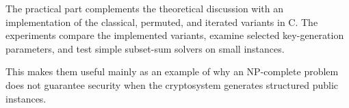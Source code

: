 The practical part complements the theoretical discussion with an implementation
of the classical, permuted, and iterated variants in C. The experiments
compare the implemented variants, examine selected key-generation parameters,
and test simple subset-sum solvers on small instances.

This makes them useful mainly as an example of why an NP-complete problem does
not guarantee security when the cryptosystem generates structured public
instances.
